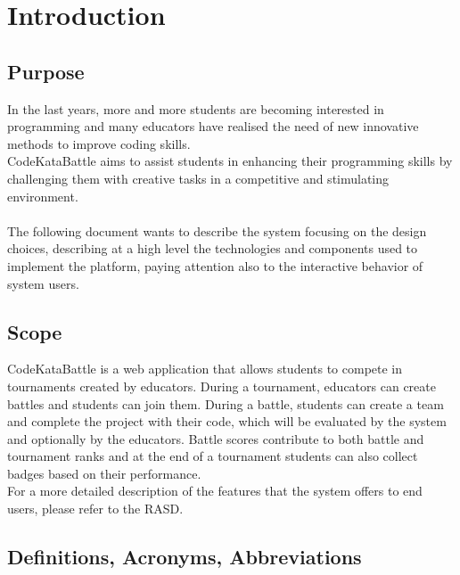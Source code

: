 \chapter{Introduction}

\section{Purpose}
In the last years, more and more students are becoming interested in programming and many educators have realised 
the need of new innovative methods to improve coding skills. \\
CodeKataBattle aims to assist students in enhancing their programming skills by challenging them with creative tasks
 in a competitive and stimulating environment. \\
 \\
 The following document wants to describe the system focusing on the design choices, describing at a high level the technologies
  and components used to implement the platform, paying attention also to the interactive behavior of system users.\\
  
\section{Scope}
CodeKataBattle is a web application that allows students to compete in tournaments created by educators. During a tournament, educators 
can create battles and students can join them. During a battle, students can create a team and complete the project with their code, which 
will be evaluated by the system and optionally by the educators. Battle scores contribute to both battle and tournament ranks and at the end 
of a tournament students can also collect badges based on their performance.\\
For a more detailed description of the features that the system offers to end users, please refer to the RASD.\\

\section{Definitions, Acronyms, Abbreviations}
